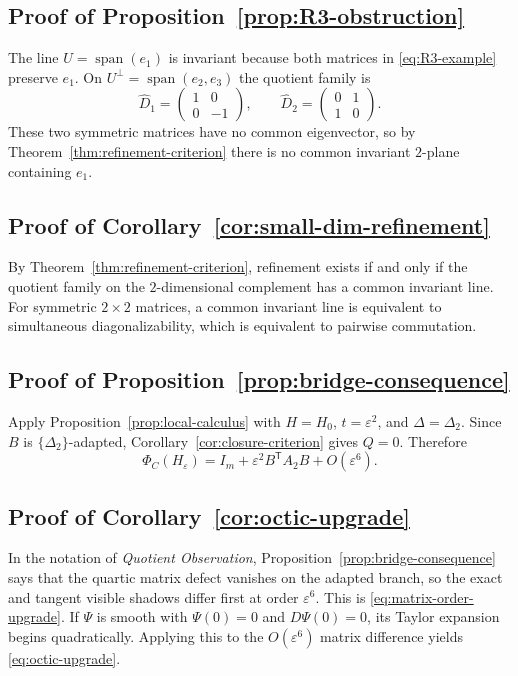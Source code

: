 \documentclass[11pt,a4paper]{article}
\numberwithin{equation}{section}
\DeclareMathOperator{\spanop}{span}
\theoremstyle{thmcompact}
\theoremstyle{remark}
\begin{document}
\subsection*{Proof of Proposition~\ref{prop:R3-obstruction}}
The line $U=\spanop(e_1)$ is invariant because both matrices in \eqref{eq:R3-example} preserve $e_1$. On $U^{\perp}=\spanop(e_2,e_3)$ the quotient family is
\[
\widehat D_1=
\begin{pmatrix}
1&0\\
0&-1
\end{pmatrix},
\qquad
\widehat D_2=
\begin{pmatrix}
0&1\\
1&0
\end{pmatrix}.
\]
These two symmetric matrices have no common eigenvector, so by Theorem~\ref{thm:refinement-criterion} there is no common invariant $2$-plane containing $e_1$.

\subsection*{Proof of Corollary~\ref{cor:small-dim-refinement}}
By Theorem~\ref{thm:refinement-criterion}, refinement exists if and only if the quotient family on the $2$-dimensional complement has a common invariant line. For symmetric $2\times 2$ matrices, a common invariant line is equivalent to simultaneous diagonalizability, which is equivalent to pairwise commutation.

\subsection*{Proof of Proposition~\ref{prop:bridge-consequence}}
Apply Proposition~\ref{prop:local-calculus} with $H=H_0$, $t=\varepsilon^2$, and $\Delta=\Delta_2$. Since $B$ is $\{\Delta_2\}$-adapted, Corollary~\ref{cor:closure-criterion} gives $Q=0$. Therefore
\[
\Phi_C(H_{\varepsilon})
=
I_m+\varepsilon^2B^{\mathsf T}A_2B+O(\varepsilon^6).
\]

\subsection*{Proof of Corollary~\ref{cor:octic-upgrade}}
In the notation of \emph{Quotient Observation}, Proposition~\ref{prop:bridge-consequence} says that the quartic matrix defect vanishes on the adapted branch, so the exact and tangent visible shadows differ first at order $\varepsilon^6$. This is \eqref{eq:matrix-order-upgrade}. If $\Psi$ is smooth with $\Psi(0)=0$ and $D\Psi(0)=0$, its Taylor expansion begins quadratically. Applying this to the $O(\varepsilon^6)$ matrix difference yields \eqref{eq:octic-upgrade}.
\end{document}
